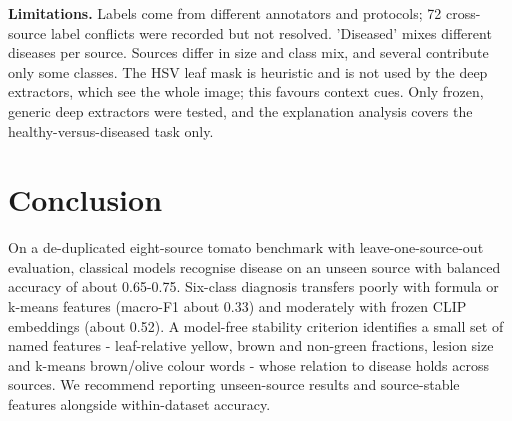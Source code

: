 \documentclass[conference]{IEEEtran}
\begin{document}
\textbf{Limitations.} Labels come from different annotators and protocols; 72 cross-source label conflicts were recorded but not resolved. 'Diseased' mixes different diseases per source. Sources differ in size and class mix, and several contribute only some classes. The HSV leaf mask is heuristic and is not used by the deep extractors, which see the whole image; this favours context cues. Only frozen, generic deep extractors were tested, and the explanation analysis covers the healthy-versus-diseased task only.

\section{Conclusion}
On a de-duplicated eight-source tomato benchmark with leave-one-source-out evaluation, classical models recognise disease on an unseen source with balanced accuracy of about 0.65-0.75. Six-class diagnosis transfers poorly with formula or k-means features (macro-F1 about 0.33) and moderately with frozen CLIP embeddings (about 0.52). A model-free stability criterion identifies a small set of named features - leaf-relative yellow, brown and non-green fractions, lesion size and k-means brown/olive colour words - whose relation to disease holds across sources. We recommend reporting unseen-source results and source-stable features alongside within-dataset accuracy.
\end{document}
